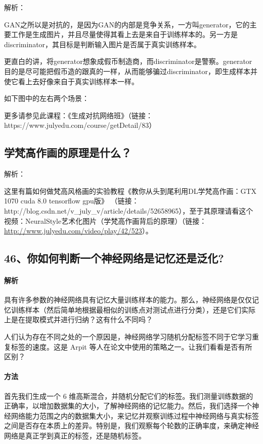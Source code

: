 \documentclass[UTF8]{ctexbook}
\begin{document}
解析：

GAN之所以是对抗的，是因为GAN的内部是竞争关系，一方叫generator，它的主要工作是生成图片，并且尽量使得其看上去是来自于训练样本的。另一方是discriminator，其目标是判断输入图片是否属于真实训练样本。



更直白的讲，将generator想象成假币制造商，而discriminator是警察。generator目的是尽可能把假币造的跟真的一样，从而能够骗过discriminator，即生成样本并使它看上去好像来自于真实训练样本一样。



如下图中的左右两个场景：

 



更多请参见此课程：《生成对抗网络班》（链接：https://www.julyedu.com/course/getDetail/83）



\subsection{学梵高作画的原理是什么？}

解析：

这里有篇如何做梵高风格画的实验教程《教你从头到尾利用DL学梵高作画：GTX 1070 cuda 8.0 tensorflow gpu版》
（链接：http://blog.csdn.net/v\_july\_v/article/details/52658965），至于其原理请看这个视频：NeuralStyle艺术化图片（学梵高作画背后的原理）（链接：\url{http://www.julyedu.com/video/play/42/523}）。
\subsection{46、你如何判断一个神经网络是记忆还是泛化?}

\paragraph{解析}


具有许多参数的神经网络具有记忆大量训练样本的能力。那么，神经网络是仅仅记忆训练样本（然后简单地根据最相似的训练点对测试点进行分类），还是它们实际上是在提取模式并进行归纳？这有什么不同吗？



人们认为存在不同之处的一个原因是，神经网络学习随机分配标签不同于它学习重复标签的速度。这是 Arpit 等人在论文中使用的策略之一。让我们看看是否有所区别？


\paragraph{方法}
 首先我们生成一个 6 维高斯混合，并随机分配它们的标签。我们测量训练数据的正确率，以增加数据集的大小，了解神经网络的记忆能力。然后，我们选择一个神经网络能力范围之内的数据集大小，来记忆并观察训练过程中神经网络与真实标签之间是否存在本质上的差异。特别是，我们观察每个轮数的正确率度，来确定神经网络是真正学到真正的标签，还是随机标签。
\end{document}
